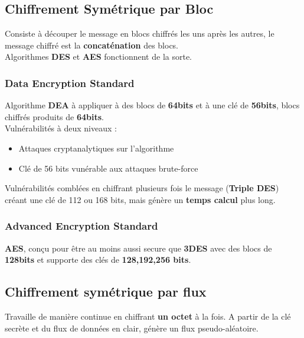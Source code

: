 \documentclass{report}
\begin{document}
		\subsection{Chiffrement Symétrique par Bloc}

			Consiste à découper le message en blocs chiffrés les uns après les autres, le message chiffré est la \textbf{concaténation} des blocs.\\
			Algorithmes \textbf{DES} et \textbf{AES} fonctionnent de la sorte.\\

			\subsubsection{Data Encryption Standard}

				Algorithme \textbf{DEA} à appliquer à des blocs de \textbf{64bits} et à une clé de \textbf{56bits}, blocs chiffrés produits de \textbf{64bits}.\\

				Vulnérabilités à deux niveaux : \\

				\begin{itemize}
					\item Attaques cryptanalytiques sur l'algorithme
					\item Clé de 56 bits vunérable aux attaques brute-force\\
				\end{itemize}

				Vulnérabilités comblées en chiffrant plusieurs fois le message (\textbf{Triple DES}) créant une clé de 112 ou 168 bits, mais génère un \textbf{temps calcul} plus long.\\

			\subsubsection{Advanced Encryption Standard}

				\textbf{AES}, conçu pour être au moins aussi secure que \textbf{3DES} avec des blocs de \textbf{128bits} et supporte des clés de \textbf{128,192,256 bits}.\\

		\subsection{Chiffrement symétrique par flux}

			Travaille de manière continue en chiffrant \textbf{un octet} à la fois. A partir de la clé secrète et du flux de données en clair, génère un flux pseudo-aléatoire.\\
\end{document}
